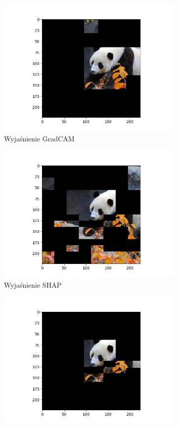 \begin{figure}[!h]
	\centering
	\begin{subfigure}[b]{0.45\textwidth}
		\includegraphics[width=.9\textwidth]{img/examples/first_explanation}
		\caption{Wyjaśnienie GradCAM}
	\end{subfigure}
	\begin{subfigure}[b]{0.45\textwidth}
		\centering\includegraphics[width=.9\textwidth]{img/examples/second_explanation}
		\caption{Wyjaśnienie SHAP}
	\end{subfigure}
	\begin{subfigure}[b]{0.45\textwidth}
		\includegraphics[width=.9\textwidth]{img/examples/and_explanation}

\end{subfigure}
\end{figure}
